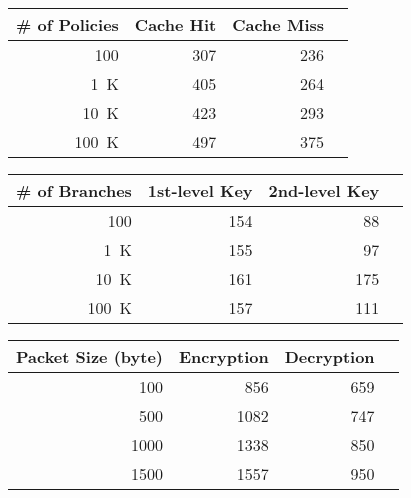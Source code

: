 \begin{table*}[!htb]%
	\begin{minipage}{.31\linewidth}
        \centering
        \caption{Benchmark results for the transfer policy lookup (ns).}
    	\label{tab:authorization}
            \begin{tabular}{*4{r}}
			\toprule
			\# of Policies & Cache Hit & Cache Miss \\
			\midrule
			100			& 307 	& 236 \\
			\SI{1}{K}	& 405 	& 264 \\
			\SI{10}{K}	& 423 	& 293 \\
			\SI{100}{K}	& 497 	& 375 \\
			\bottomrule
		\end{tabular}
	\end{minipage}\hspace*{2em}
    \begin{minipage}{.31\linewidth}
    	\caption{Key derivation times for different network sizes (ns).}
     	\label{tab:derivation}
      	\centering
         \begin{tabular}{*4{r}}
			\toprule
			\# of Branches & 1st-level Key & 2nd-level Key \\
			\midrule
			100			& 154 	& 88 \\	%
			\SI{1}{K}		& 155 	& 97 \\	%
			\SI{10}{K}		& 161 	& 175 \\	%
			\SI{100}{K}		& 157	& 111 \\	%
			\bottomrule
		\end{tabular}
    \end{minipage}\hspace*{2em}
    \begin{minipage}{.31\linewidth}
      	\centering
        \caption{Processing times for the encryption/decryption (ns).}
    	\label{tab:authentication}
        \begin{tabular}{*4{r}}
			\toprule
			Packet Size (byte) & Encryption & Decryption \\
			\midrule
			100		& 856 	& 659 \\
			500		& 1082 	& 747 \\
			1000	& 1338 	& 850 \\
			1500	& 1557 	& 950 \\
			\bottomrule
		\end{tabular}
    \end{minipage}
\end{table*}

